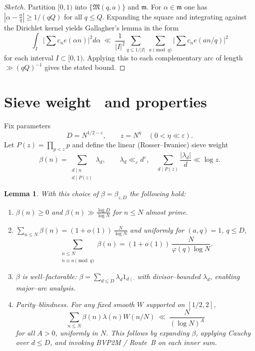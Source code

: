 \documentclass[11pt]{article}
\newtheorem{lemma}{Lemma}[part]
\theoremstyle{definition}
\theoremstyle{remark}
\numberwithin{equation}{part}
\begin{document}
\begin{proof}[Sketch]
	Partition $[0,1)$ into $\{\mathfrak M(q,a)\}$ and $\mathfrak m$. For $\alpha\in\mathfrak m$ one has
	$|\alpha-\tfrac aq|\ge 1/(qQ)$ for all $q\le Q$. Expanding the square and integrating against the Dirichlet kernel yields Gallagher's lemma in the form
	\[
		\int_{I} \Big|\sum c_n e(\alpha n)\Big|^2 d\alpha
		\ \ll\ \frac{1}{|I|^2}\sum_{q\le 1/|I|}\ \sum_{a\pmod q}\Big|\sum c_n e(an/q)\Big|^2
	\]
	for each interval $I\subset[0,1)$. Applying this to each complementary arc of length $\gg (qQ)^{-1}$ gives the stated bound.
\end{proof}

\section{Sieve weight \textbeta\ and properties}

Fix parameters
\[
	D=N^{1/2-\varepsilon},\qquad z=N^{\eta}\quad(0<\eta\ll \varepsilon).
\]
Let $P(z)=\prod_{p<z}p$ and define the linear (Rosser--Iwaniec) sieve weight
\[
	\beta(n)=\sum_{\substack{d\mid n\\ d\mid P(z)}} \lambda_d,\qquad
	\lambda_d\ll_\varepsilon d^{\varepsilon},\quad
	\sum_{d\mid P(z)}\frac{|\lambda_d|}{d}\ll \log z.
\]

\begin{lemma}\label{lem:beta-properties}
	With this choice of $\beta=\beta_{z,D}$ the following hold:
	\begin{enumerate}[label=(B\arabic*)]
		\item $\beta(n)\ge 0$ and $\beta(n)\gg \frac{\log D}{\log N}$ for $n\le N$ almost prime.
		\item $\sum_{n\le N}\beta(n)=(1+o(1))\,\tfrac{N}{\log N}$ and uniformly for $(a,q)=1$, $q\le D$,
		      \[
			      \sum_{\substack{n\le N\\ n\equiv a\pmod q}}\beta(n)
			      =(1+o(1))\,\frac{N}{\varphi(q)\log N}.
		      \]
		\item $\beta$ is well--factorable: $\beta=\sum_{d\le D}\lambda_d 1_{d\mid\cdot}$ with divisor--bounded $\lambda_d$, enabling major--arc analysis.
		\item \emph{Parity--blindness.} For any fixed smooth $W$ supported on $[1/2,2]$,
		      \[
			      \sum_{n\le N}\beta(n)\lambda(n)W(n/N)
			      \ \ll\ \frac{N}{(\log N)^A}
		      \]
		      for all $A>0$, uniformly in $N$. This follows by expanding $\beta$, applying Cauchy over $d\le D$, and invoking BVP2M / Route~B on each inner sum.
	\end{enumerate}
\end{lemma}
\end{document}
